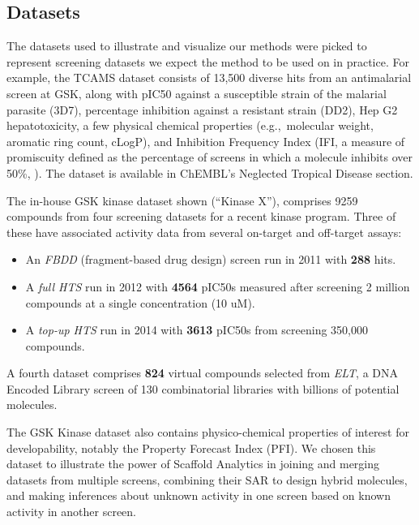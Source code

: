 \documentclass[journal=jacsat,manuscript=article]{achemso}
\newcommand*\eg{e.g.,~}
\begin{document}
\subsection{Datasets}
\label{sec:datasets}
The datasets used to illustrate and visualize our methods were picked
to represent screening datasets we expect the method to
be used on in practice. For example, the TCAMS dataset\cite{Gamo2010}
consists of 13,500 diverse hits from an antimalarial screen at GSK,
along with pIC50 against a susceptible strain of the malarial parasite
(3D7), percentage inhibition against a resistant strain (DD2), Hep G2
hepatotoxicity, a few physical chemical properties (\eg molecular
weight, aromatic ring count, cLogP), and Inhibition Frequency Index
(IFI, a measure of promiscuity defined as the percentage of screens in
which a molecule inhibits over 50\%, \cite{Chakravorty2013IFI}). The dataset is available in Ch{EMBL}'s Neglected Tropical Disease section\cite{ChEMBLNTD}.

The in-house GSK kinase dataset shown (``Kinase X''), comprises 9259
compounds from four screening datasets for a recent kinase program.
Three of these have associated activity data from several on-target and off-target
assays: 
\begin{itemize}
\item An {\it FBDD}\cite{FBDD} (fragment-based drug design) screen run in 2011 with {\bf 288} hits.
\item A {\it full HTS} run in 2012 with {\bf 4564} {pIC50s} measured after screening 2 million compounds at a single concentration (10 uM).
\item A {\it top-up HTS} run in 2014 with {\bf 3613} {pIC50s} from screening 350,000 compounds.
\end{itemize}
A fourth dataset comprises {\bf 824} virtual compounds selected from
{\it ELT}, a DNA Encoded Library screen\cite{ELT} of 130
combinatorial libraries with billions of potential molecules.

The GSK Kinase dataset also contains physico-chemical properties of interest for
developability, notably the Property Forecast Index (PFI\cite{Young2011}). 
We chosen this dataset to illustrate the power of Scaffold Analytics in joining
and merging datasets from multiple screens, combining their SAR to
design hybrid molecules, and making inferences about unknown activity
in one screen based on known activity in another screen.
\end{document}
